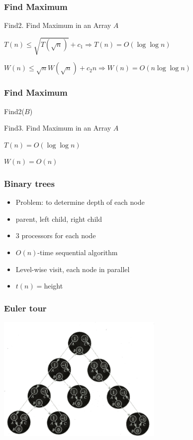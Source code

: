 \documentclass[14pt]{beamer}
\begin{document}
\begin{frame}\frametitle{Find Maximum}
\begin{algorithm}[H]
\caption{Find2.    
Find Maximum in an Array $A$}
\end{algorithm}
$T(n)\le \sqrt{T(\sqrt{n})} + c_{1} \Rightarrow T(n) = O(\log \log n)$

$W(n)\le \sqrt{n} W(\sqrt{n}) + c_{2}n \Rightarrow W(n) = O(n \log \log n)$
\end{frame}


\begin{frame}\frametitle{Find Maximum}
\begin{algorithm}[H]
Find2($B$)\;
\caption{Find3.    
Find Maximum in an Array $A$}
\end{algorithm}
$T(n) = O(\log \log n)$

$W(n) = O(n)$
\end{frame}


\begin{frame}\frametitle{Binary trees}
  \begin{itemize}
  \item
    Problem: to determine depth of each node
  \item
    parent, left child, right child
  \item
    $3$ processors for each node
  \item
    $O(n)$-time sequential algorithm
  \item
    Level-wise visit, each node in parallel
  \item
    $t(n)=$height
  \end{itemize}
\end{frame}


\begin{frame}\frametitle{Euler tour}
  \begin{center}
    \includegraphics[width=8cm]{euler1.png}
  \end{center}

\end{frame}
\end{document}
